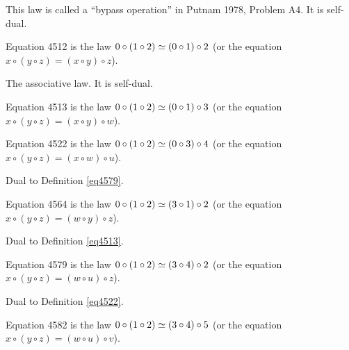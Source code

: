 This law is called a ``bypass operation'' in Putnam 1978, Problem A4. It is self-dual.

\begin{definition}[Equation 4512]\label{eq4512}\leanok{}  Equation 4512 is the law $0 \circ (1 \circ 2)  \simeq  (0 \circ 1) \circ 2$ (or the equation $x \circ (y \circ z) = (x \circ y) \circ z$).
\end{definition}

The associative law. It is self-dual.

\begin{definition}[Equation 4513]\label{eq4513}\leanok{}  Equation 4513 is the law $0 \circ (1 \circ 2)  \simeq  (0 \circ 1) \circ 3$ (or the equation $x \circ (y \circ z) = (x \circ y) \circ w$).
\end{definition}

\begin{definition}[Equation 4522]\label{eq4522}\leanok{}  Equation 4522 is the law $0 \circ (1 \circ 2)  \simeq  (0 \circ 3) \circ 4$ (or the equation $x \circ (y \circ z) = (x \circ w) \circ u$).
\end{definition}

Dual to Definition \ref{eq4579}.

\begin{definition}[Equation 4564]\label{eq4564}\leanok{}  Equation 4564 is the law $0 \circ (1 \circ 2)  \simeq  (3 \circ 1) \circ 2$ (or the equation $x \circ (y \circ z) = (w \circ y) \circ z$).
\end{definition}

Dual to Definition \ref{eq4513}.

\begin{definition}[Equation 4579]\label{eq4579}\leanok{}  Equation 4579 is the law $0 \circ (1 \circ 2)  \simeq  (3 \circ 4) \circ 2$ (or the equation $x \circ (y \circ z) = (w \circ u) \circ z$).
\end{definition}

Dual to Definition \ref{eq4522}.

\begin{definition}[Equation 4582]\label{eq4582}\leanok{}  Equation 4582 is the law $0 \circ (1 \circ 2)  \simeq  (3 \circ 4) \circ 5$ (or the equation $x \circ (y \circ z) = (w \circ u) \circ v$).
\end{definition}

